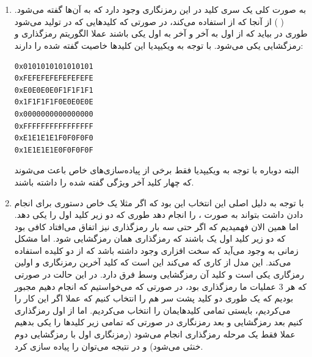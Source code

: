 \documentclass[]{article}
\begin{document}
\section{}
\begin{enumerate}
    \item به صورت کلی یک سری کلید در این رمزنگاری وجود دارد که به آن‌ها  گفته می‌شود.
    ( )
    از آنجا که
     از  استفاده می‌کند،
    در صورتی که کلید‌هایی که در
    تولید می‌شود طوری در بیاید که از اول به آخر و آخر به اول یکی باشند عملا الگوریتم
    رمزگذاری و رمزگشایی یکی می‌شود. با توجه به ویکیپدیا این کلید‌ها خاصیت گفته شده را دارند:
    \begin{latin}
    \begin{lstlisting}
0x0101010101010101
0xFEFEFEFEFEFEFEFE
0xE0E0E0E0F1F1F1F1
0x1F1F1F1F0E0E0E0E
0x0000000000000000
0xFFFFFFFFFFFFFFFF
0xE1E1E1E1F0F0F0F0
0x1E1E1E1E0F0F0F0F
\end{lstlisting}
    \end{latin}
    البته دوباره با توجه به ویکیپدیا فقط برخی از پیاده‌سازی‌های خاص باعث می‌شوند که چهار کلید آخر ویژگی گفته شده را داشته باشند.
    \item با توجه به
    دلیل اصلی این انتخاب این بود که اگر مثلا یک
    خاص دستوری برای انجام دادن
    داشت بتواند به صورت
    ، 
    را انجام دهد طوری که دو زیر کلید اول را یکی دهد. اما همین الان فهمیدیم که اگر حتی سه بار رمزگذاری نیز
    اتفاق می‌افتاد کافی بود که دو زیر کلید اول یک
    باشند که رمزگذاری همان رمزگشایی شود. اما مشکل زمانی به وجود می‌آید که سخت افزاری وجود داشته باشد
    که از
     دو کلیده
    استفاده می‌کند. این مدل از
    کاری که می‌کند این است که کلید آخرین رمزنگاری و اولین رمزگاری یکی است و کلید آن رمزگشایی وسط فرق دارد.
    در این حالت در صورتی که هر 3 عملیات ما رمزگذاری بود، در صورتی که می‌خواستیم که
    انجام دهیم مجبور بودیم که یک طوری دو کلید پشت سر هم را
    انتخاب کنیم که عملا اگر این کار را می‌کردیم، بایستی تمامی کلید‌هایمان را
    انتخاب می‌کردیم. اما از اول رمزگذاری کنیم بعد رمزگشایی و بعد رمزنگاری در صورتی که تمامی
    زیر کلید‌ها را یکی بدهیم عملا فقط یک مرحله رمزگذاری انجام می‌شود
    (رمزنگاری اول با رمزگشایی دوم خنثی می‌شود)
    و در نتیجه می‌توان
    را پیاده سازی کرد.
\end{enumerate}
\end{document}
